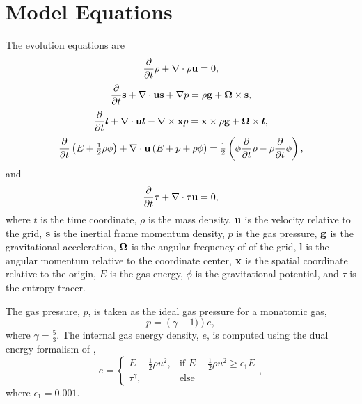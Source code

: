 \documentclass{aastex63}
\begin{document}
\newcommand{\ddt}[1]{\frac{\partial}{\partial t} #1} 
\newcommand{\divergence}[1]{{\bf \nabla} \cdot #1}
\newcommand{\curl}[1]{{\bf \nabla} \times #1}
\newcommand{\gradient}[1]{{\bf \nabla} #1}
\newcommand{\vect}[1]{{\bf #1}}
\newcommand{\am}{\bm{l}}


\section{Model Equations}
The evolution equations are
\begin{equation}
\ddt{\rho}+\divergence{\rho\vect{u}}=0,
\label{rho}
\end{equation}
\begin{equation}
\ddt{\vect{s}}+\divergence{\vect{u}\vect{s} + \gradient{p}}=\rho \vect{g} + \vect{\Omega} \times \vect{s},
\label{rhou}
\end{equation}
\begin{equation}
\ddt{\am}+\divergence{\vect{u}\am - \curl{\vect{x} p}}=\vect{x}\times\rho \vect{g} + \vect{\Omega} \times \am,
\label{am}
\end{equation}
\begin{equation}
\ddt{\left(E+\tfrac{1}{2}\rho\phi\right)}+\divergence{\vect{u}\left(E+p+\rho\phi\right)}=\tfrac{1}{2}\left(\phi\ddt{\rho}-\rho\ddt{\phi}\right),
\label{E}
\end{equation}
and
\begin{equation}
\ddt{\tau}+\divergence{\tau\vect{u}}=0,
\label{tau}
\end{equation}
where $t$ is the time coordinate, $\rho$ is the mass density, $\vect{u}$ is the velocity relative to the grid, $\vect{s}$ is the inertial frame momentum density, $p$ is the gas pressure, 
$\vect{g}$ is the gravitational acceleration, 
$\vect{\Omega}$ is the angular frequency of of the grid,
$\am$ is the angular momentum relative to the coordinate center, 
$\vect{x}$ is the spatial coordinate relative to the origin, 
$E$ is the gas energy, $\phi$ is the gravitational potential, 
and $\tau$ is the entropy tracer.

The gas pressure, $p$, is taken as the ideal gas pressure for a monatomic gas, 
\begin{equation}
p = \left( \gamma - 1 ) \right) e, 
\end{equation}
where $\gamma = \tfrac{5}{3}$. The internal gas energy density, $e$, is computed using the dual energy formalism of \cite{BRYAN1995},
\begin{equation}
    e = 
\begin{cases}
    E - \tfrac{1}{2} \rho u^2, & \text{if } E - \tfrac{1}{2} \rho u^2 \geq \epsilon_1 E\\
    \tau^{\gamma},             & \text{else}
\end{cases},
\end{equation}
where $\epsilon_1 = 0.001$.
\end{document}

